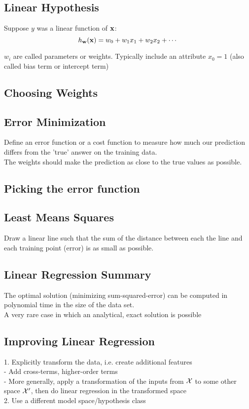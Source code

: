 \documentclass[10pt,landscape,a4paper]{cheatsheet}
\begin{document}
  \subsection{Linear Hypothesis}
  Suppose $y$ was a linear function of ${\bf x}$:
    $$h_{\bf w}({\bf x}) = w_0 + w_1 x_1 + w_2 x_2 + \cdots$$

    $w_i$ are called  parameters or weights. Typically include an attribute $x_0=1$ (also called  bias
    term or  intercept term) 

  \subsection{Choosing Weights}

  \subsection{Error Minimization}
  Define an error function or a cost function to measure how much our prediction differs from the 'true' answer on the training data.\\
  The weights should make the prediction as close to the true values as possible.

  \subsection{Picking the error function}

  \subsection{Least Means Squares}
  Draw a linear line such that the sum of the distance between each the line and each training point (error) is as small as possible.

  \subsection{Linear Regression Summary}
  The optimal solution (minimizing sum-squared-error) can be computed
  in polynomial time in the size of the data set.\\
  A very rare case in which an analytical, exact solution is possible\newline

  \subsection{Improving Linear Regression}
   1.  Explicitly transform the data, i.e. create additional features\\
        -   Add cross-terms, higher-order terms\\
        -   More generally, apply a transformation of the inputs from
            ${\cal X}$ to some other space ${\cal X}'$, then do linear
            regression in the transformed space\\
    2.  Use a different model space/hypothesis class\newline
\end{document}
